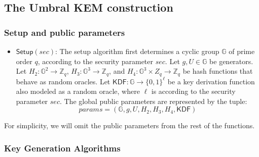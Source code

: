 \documentclass{amsart}
\begin{document}
\subsection{The Umbral KEM construction}

\subsubsection{Setup and public parameters}

\begin{itemize}

\item $\mathsf{Setup}(sec)$: The setup algorithm first determines a cyclic group $\mathbb G$ of prime order $q$, according to the security parameter $sec$. Let $g, U\in \mathbb G$ be generators. Let $H_2: \mathbb G^2 \to \mathbb Z_q$, $H_3: \mathbb G^3 \to \mathbb Z_q$, and $H_4: \mathbb G^3 \times Z_q \to \mathbb Z_q$ be hash functions that behave as random oracles. Let $\mathsf{KDF}: \mathbb G \to \{0,1\}^\ell$ be a key derivation function also modeled as a random oracle, where $\ell$ is according to the security parameter $sec$. The global public parameters are represented by the tuple:
$$params = (\mathbb G, g, U, H_2, H_3, H_4, \mathsf{KDF})$$

\end{itemize}

For simplicity, we will omit the public parameters from the rest of the functions. 

\subsubsection{Key Generation Algorithms}
\end{document}
